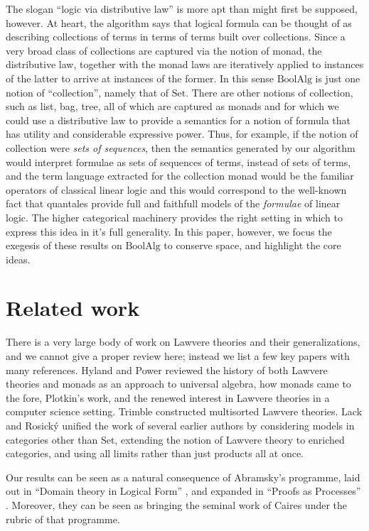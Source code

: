 \documentclass{llncs}
\renewcommand{\:}{\colon}
\newcommand{\Set}{\mathrm{Set}}
\newcommand{\BoolAlg}{\mathrm{BoolAlg}}
\begin{document}
The slogan ``logic via distributive law'' is more apt than might first
be supposed, however. At heart, the algorithm says that logical
formula can be thought of as describing collections of terms in terms
of terms built over collections. Since a very broad class of
collections are captured via the notion of monad, the distributive
law, together with the monad laws are iteratively applied to instances
of the latter to arrive at instances of the former. In this sense
$\BoolAlg$ is just one notion of ``collection'', namely that of
$\Set$. There are other notions of collection, such as list, bag,
tree, all of which are captured as monads and for which we could use a
distributive law to provide a semantics for a notion of formula that
has utility and considerable expressive power. Thus, for example, if
the notion of collection were \emph{sets of sequences}, then the
semantics generated by our algorithm would interpret formulae as sets
of sequences of terms, instead of sets of terms, and the term language
extracted for the collection monad would be the familiar operators of
classical linear logic and this would correspond to the well-known
fact that quantales provide full and faithfull models of the
\emph{formulae} of linear logic. The higher categorical machinery
provides the right setting in which to express this idea in it's full
generality. In this paper, however, we focus the exegesis of these
results on $\BoolAlg$ to conserve space, and highlight the core ideas.

\section{Related work}

There is a very large body of work on Lawvere theories and their
generalizations, and we cannot give a proper review here; instead we
list a few key papers with many references.  Hyland and Power
\cite{DBLP:journals/entcs/HylandP07} reviewed the history of both
Lawvere theories and monads as an approach to universal algebra, how
monads came to the fore, Plotkin's work, and the renewed interest in
Lawvere theories in a computer science setting.  Trimble
\cite{Trimble} constructed multisorted Lawvere theories.  Lack and
Rosick\'y \cite{DBLP:journals/acs/LackR11} unified the work of several
earlier authors by considering models in categories other than Set,
extending the notion of Lawvere theory to enriched categories, and
using all limits rather than just products all at once.

Our results can be seen as a natural consequence of Abramsky's
programme, laid out in ``Domain theory in Logical Form''
\cite{DBLP:journals/apal/Abramsky91}, and expanded in ``Proofs as
Processes'' \cite{Abramsky:1992:PP:194588.194591}.  Moreover, they can
be seen as bringing the seminal work of Caires \cite{Caires} under the
rubric of that programme.
\end{document}
